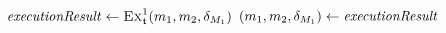 \begin{algorithmic}[1]
        \algindentskip
            \State \Return{$\bot$}
        \EndIf
        \algblockskip

            \State $\mathvariable{executionResult} \gets \function{Ex}_\transformation{t}^1(\model{m}{1}, \model{m}{2}, \change{\metamodel{M}{1}})$
                \State \Return{$\bot$} \label{algo:synchronization:execute_bidirectional_transformation:line:returnbot}
            \Else
                \State $(\model{m}{1}, \model{m}{2}, \change{\metamodel{M}{1}}) \gets \mathvariable{executionResult}$
            \EndIf
        \EndWhile
        \algblockskip

        \State {} \label{algo:synchronization:execute_bidirectional_transformation:line:returnresult}
        \algindentskip
    \EndProcedure
\end{algorithmic}